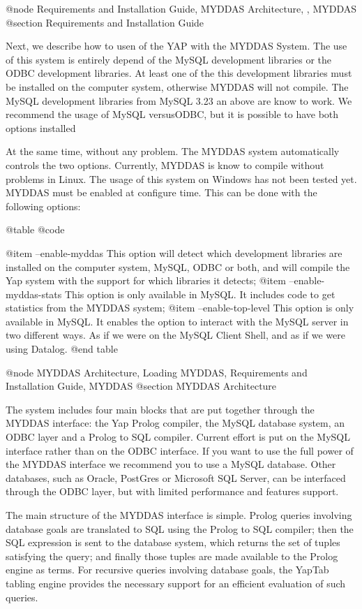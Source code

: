 {{{{{{{{{@node Requirements and Installation Guide, MYDDAS Architecture, , MYDDAS
@section Requirements and Installation Guide

Next, we describe how to usen of the YAP with the MYDDAS System.  The
use of this system is entirely depend of the MySQL development libraries
or the ODBC development libraries. At least one of the this development
libraries must be installed on the computer system, otherwise MYDDAS
will not compile. The MySQL development libraries from MySQL 3.23 an
above are know to work. We recommend the usage of MySQL versusODBC,
but it is possible to have both options installed

At the same time, without any problem. The MYDDAS system automatically
controls the two options. Currently, MYDDAS is know to compile without
problems in Linux. The usage of this system on Windows has not been
tested yet.  MYDDAS must be enabled at configure time. This can be done
with the following options: 

@table @code

@item --enable-myddas
 This option will detect which development libraries are installed on the computer system, MySQL, ODBC or both, and will compile the Yap system with the support for which libraries it detects;
@item  --enable-myddas-stats
This option is only available in MySQL. It includes code to get
statistics from the MYDDAS system;
@item  --enable-top-level
This option is only available in MySQL.  It enables the option to interact with the MySQL server in
two different ways. As if we were on the MySQL Client Shell, and as if
we were using Datalog. 
@end table

@node MYDDAS Architecture, Loading MYDDAS, Requirements and Installation Guide, MYDDAS
@section MYDDAS Architecture

The system includes four main blocks that are put together through the
MYDDAS interface: the Yap Prolog compiler, the MySQL database system, an
ODBC layer and a Prolog to SQL compiler. Current effort is put on the
MySQL interface rather than on the ODBC interface. If you want to use
the full power of the MYDDAS interface we recommend you to use a MySQL
database. Other databases, such as Oracle, PostGres or Microsoft SQL
Server, can be interfaced through the ODBC layer, but with limited
performance and features support.  

The main structure of the MYDDAS interface is simple. Prolog queries
involving database goals are translated to SQL using the Prolog to SQL
compiler; then the SQL expression is sent to the database system, which
returns the set of tuples satisfying the query; and finally those tuples
are made available to the Prolog engine as terms. For recursive queries
involving database goals, the YapTab tabling engine provides the
necessary support for an efficient evaluation of such queries.

}}}}}}}}}
